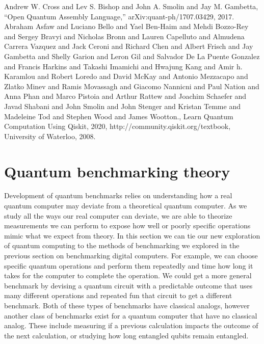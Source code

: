 \documentclass{article}
\begin{document}
\begin{thebibliography}{00}
    \makeatletter
    \addtocounter{\@listctr}{4}
    \makeatother
     Andrew W. Cross and Lev S. Bishop and John A. Smolin and Jay M. Gambetta, ``Open Quantum Assembly Language,'' arXiv:quant-ph/1707.03429, 2017.      
     Abraham Asfaw and Luciano Bello and Yael Ben-Haim and Mehdi Bozzo-Rey and Sergey Bravyi and Nicholas Bronn and Lauren Capelluto and Almudena Carrera Vazquez and Jack Ceroni and Richard Chen and Albert Frisch and Jay Gambetta and Shelly Garion and Leron Gil and Salvador De La Puente Gonzalez and Francis Harkins and Takashi Imamichi and Hwajung Kang and Amir h. Karamlou and Robert Loredo and David McKay and Antonio Mezzacapo and Zlatko Minev and Ramis Movassagh and Giacomo Nannicni and Paul Nation and Anna Phan and Marco Pistoia and Arthur Rattew and Joachim Schaefer and Javad Shabani and John Smolin and John Stenger and Kristan Temme and Madeleine Tod and Stephen Wood and James Wootton., Learn Quantum Computation Using Qiskit, 2020, {http://community.qiskit.org/textbook}, University of Waterloo, 2008.
\end{thebibliography}

\section{Quantum benchmarking theory}

Development of quantum benchmarks relies on understanding how a real quantum computer may deviate from a theoretical quantum computer. As we study all the ways our real computer can deviate, we are able to theorize measurements we can perform to expose how well or poorly specific operations mimic what we expect from theory. In this section we can tie our new exploration of quantum computing to the methods of benchmarking we explored in the previous section on benchmarking digital computers. For example, we can choose specific quantum operations and perform them repeatedly and time how long it takes for the computer to complete the operation. We could get a more general benchmark by devising a quantum circuit with a predictable outcome that uses many different operations and repeated fun that circuit to get a different benchmark. Both of these types of benchmarks have classical analogs, however another class of benchmarks exist for a quantum computer that have no classical analog. These include measuring if a previous calculation impacts the outcome of the next calculation, or studying how long entangled qubits remain entangled.
\end{document}
